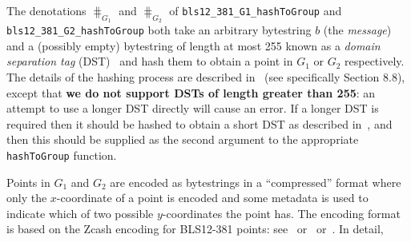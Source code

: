 \label{note:hashing-into-group}
The denotations $\hash_{G_1}$ and $\hash_{G_2}$
of \texttt{bls12\_381\_G1\_hashToGroup} and
\texttt{bls12\_381\_G2\_hashToGroup} both take an arbitrary bytestring $b$ (the
\textit{message}) and a (possibly empty) bytestring of length at most 255 known as a \textit{domain
separation tag} (DST)~\cite[2.2.5]{IETF-hash-to-curve} and hash them to obtain a
point in $G_1$ or $G_2$ respectively.  The details of the hashing process are
described in~\cite{IETF-hash-to-curve} (see specifically Section 8.8), except
that
\textbf{we do not support DSTs of length greater than 255}: an attempt to use a
longer DST directly will cause an error.  If a longer DST is required then it
should be hashed to obtain a short DST as described
in~\cite[5.3.3]{IETF-hash-to-curve}, and then this should be supplied as the
second argument to the appropriate \texttt{hashToGroup} function.


\newcommand{\ymin}{y_{\text{min}}}
\newcommand{\ymax}{y_{\text{max}}}

\label{note:group-compression}
Points in $G_1$ and $G_2$ are encoded as bytestrings in a ``compressed'' format
where only the $x$-coordinate of a point is encoded and some metadata is used to
indicate which of two possible $y$-coordinates the point has.  The encoding
format is based on the Zcash encoding for BLS12-381 points:
see~\cite{Zcash-serialisation} or~\cite[``Serialization'']{BLST-library}
or~\cite[Appendices C and D]{IETF-pairing-friendly-curves}.  In detail,

